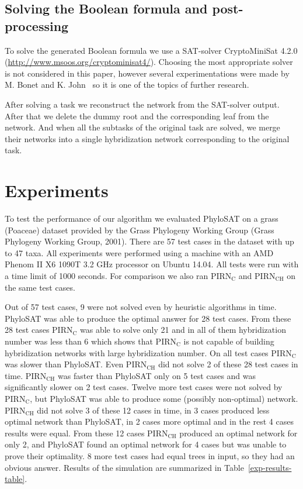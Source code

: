 \documentclass[runningheads, envcountsame, a4paper]{llncs}
\begin{document}
\subsection{Solving the Boolean formula and post-processing}

To solve the generated Boolean formula we use a SAT-solver CryptoMiniSat 4.2.0 (\url{http://www.msoos.org/cryptominisat4/}).
Choosing the most appropriate solver is not considered in this paper, however several experimentations were made by 
M. Bonet and K. John~\cite{bonet2009efficiently} so it is one of the topics of further research.

After solving a task we reconstruct the network from the SAT-solver output. After that we delete the dummy root and the corresponding 
leaf from the network. And when all the subtasks of the original task are solved, we merge their networks into a single 
hybridization network corresponding to the original task.

\section{Experiments}

To test the performance of our algorithm we evaluated PhyloSAT on a grass (Poaceae) dataset provided by the Grass Phylogeny Working Group 
(Grass Phylogeny Working Group, 2001). There are 57 test cases in the dataset with up to 47 taxa. All experiments were performed using a machine with an AMD Phenom II X6 1090T 3.2 GHz 
processor on Ubuntu 14.04. All tests were run with a time limit of 1000 seconds. For comparison we also ran PIRN$\mathrm{_C}$ and PIRN$\mathrm{_{CH}}$ 
on the same test cases. 

Out of 57 test cases, 9 were not solved even by heuristic algorithms in time. PhyloSAT was able to produce the optimal answer for 28
test cases. From these 28 test cases PIRN$\mathrm{_C}$ was able to solve only 21 and in all of them hybridization number was less than 6
which shows that PIRN$\mathrm{_C}$ is not capable of building hybridization networks with large hybridization number.
On all test cases PIRN$\mathrm{_C}$ was slower than PhyloSAT.
Even PIRN$\mathrm{_{CH}}$ did not solve 2 of these 28 test cases in time. PIRN$\mathrm{_{CH}}$ was faster than PhyloSAT only
on 5 test cases and was significantly slower on 2 test cases. Twelve more test cases were not solved by PIRN$\mathrm{_C}$, but PhyloSAT
was able to produce some (possibly non-optimal) network. PIRN$\mathrm{_{CH}}$ did not solve 3 of these 12 cases in time, in 3 cases 
produced less optimal network than PhyloSAT, in 2 cases more optimal and in the rest 4 cases results were equal. From these 12 cases PIRN$\mathrm{_{CH}}$
produced an optimal network for only 2, and PhyloSAT found an optimal network for 4 cases but was unable to prove their optimality. 
8 more test cases had equal trees in input, so they had an obvious answer.
Results of the simulation are summarized in Table~\ref{exp-results-table}.
\end{document}
